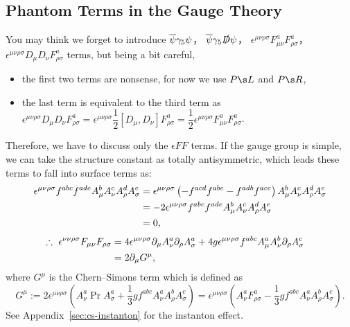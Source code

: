 \subsection{Phantom Terms in the Gauge Theory}
\label{sec:no-other-term}
You may think we forget to introduce
$\overline\psi\G5\psi$，
$\overline\psi\G5\slashed D\psi$，
$\epsilon^{\mu\nu\rho\sigma}F^a_{\mu\nu}F^a_{\rho\sigma}$，
$\epsilon^{\mu\nu\rho\sigma}D_\mu D_\nu F^a_{\rho\sigma}$
terms, but being a bit careful,
\begin{itemize}
 \item the first two terms are nonsense, for now we use $\PL$ and $\PR$,
 \item the last term is equivalent to the third term as\\[.5zw]\qquad
$\epsilon^{\mu\nu\rho\sigma}D_\mu D_\nu F^a_{\rho\sigma}
=\epsilon^{\mu\nu\rho\sigma}\dfrac12[D_\mu,D_\nu]F^a_{\rho\sigma}
=\dfrac12\epsilon^{\mu\nu\rho\sigma}F^a_{\mu\nu}F^a_{\rho\sigma}$.
\end{itemize}\vspace{.5zw}
Therefore, we have to discuss only the $\epsilon FF$ terms.
If the gauge group is simple, we can take the structure constant as totally antisymmetric, which leads these terms to fall into surface terms as:
\begin{align}
 \epsilon^{\mu\nu\rho\sigma}f^{abc}f^{ade}A^b_\mu A^c_\nu A^d_\rho A^e_\sigma
 &= \epsilon^{\mu\nu\rho\sigma}\left(-f^{acd}f^{abe}-f^{adb}f^{ace}\right)
     A^b_\mu A^c_\nu A^d_\rho A^e_\sigma\notag\\
 &= -2\epsilon^{\mu\nu\rho\sigma}f^{abc}f^{ade}A^b_\mu A^c_\nu A^d_\rho A^e_\sigma\\
 &=  0,\notag
\end{align}
\begin{align}
 \therefore\ \epsilon^{\nu\nu\rho\sigma}F_{\mu\nu}F_{\rho\sigma}
&= 4\epsilon^{\mu\nu\rho\sigma}\partial_\mu A^a_\nu\partial_\rho A^a_\sigma
 + 4g\epsilon^{\mu\nu\rho\sigma}f^{abc}A^a_\mu A^b_\nu\partial_\rho A^c_\sigma\notag\\
&= 2\partial_\mu G^\mu,&
\end{align}
where $G^\mu$ is the Chern--Simons term which is defined as
\begin{equation}
  G^\mu
:= 2\epsilon^{\mu\nu\rho\sigma}
\left( A^a_\nu\Pr A^a_\sigma+\frac13gf^{abc}A^a_\nu A^b_\rho A^c_\sigma \right)
= \epsilon^{\mu\nu\rho\sigma}
\left( A^a_\nu F^a_{\rho\sigma}-\frac13gf^{abc}A^a_\nu A^b_\rho A^c_\sigma \right).
\end{equation}
See Appendix~\ref{sec:cs-instanton} for the instanton effect.

